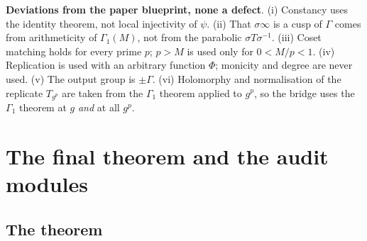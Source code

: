 \begin{warning}
\textbf{Deviations from the paper blueprint, none a defect}.
(i) Constancy uses the identity theorem, not local injectivity of $\psi$.  (ii) That $\sigma\infty$ is a cusp of $\Gamma$
comes from arithmeticity of $\Gamma_1(M)$, not from the parabolic $\sigma T\sigma^{-1}$.  (iii) Coset matching holds for
every prime $p$; $p>M$ is used only for $0<M/p<1$.  (iv) Replication is used with an arbitrary function $\Phi$; monicity
and degree are never used.  (v) The output group is $\pm\Gamma$.  (vi) Holomorphy and normalisation of the replicate
$T_{g^p}$ are taken from the $\Gamma_1$ theorem applied to $g^p$, so the bridge uses the $\Gamma_1$ theorem at $g$
\emph{and} at all $g^p$.
\end{warning}


\section{The final theorem and the audit modules}\label{ch16:sec:final}

\subsection{The theorem}

